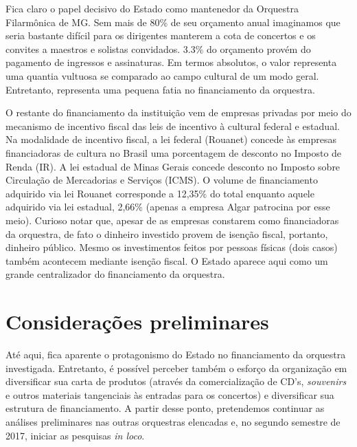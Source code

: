 \documentclass[a4paper, 12pt, openright, oneside, german, french, english, brazil]{abntex2}
\begin{document}
	Fica claro o papel decisivo do Estado como mantenedor da Orquestra Filarmônica de MG. Sem mais de 80\% de seu orçamento anual imaginamos que seria bastante difícil para os dirigentes manterem a cota de concertos e os convites a maestros e solistas convidados. 3.3\% do orçamento provém do pagamento de ingressos e assinaturas. Em termos absolutos, o valor representa uma quantia vultuosa se comparado ao campo cultural de um modo geral. Entretanto, representa uma pequena fatia no financiamento da orquestra.
	
	O restante do financiamento da instituição vem de empresas privadas por meio do mecanismo de incentivo fiscal das leis de incentivo à cultural federal e estadual. Na modalidade de incentivo fiscal, a lei federal (Rouanet) concede às empresas financiadoras de cultura no Brasil uma porcentagem de desconto no Imposto de Renda (IR). A lei estadual de Minas Gerais concede desconto no Imposto sobre Circulação de Mercadorias e Serviços (ICMS). O volume de financiamento adquirido via lei Rouanet corresponde a 12,35\% do total enquanto aquele adquirido via lei estadual, 2,66\% (apenas a empresa Algar patrocina por esse meio). Curioso notar que, apesar de as empresas constarem como financiadoras da orquestra, de fato o dinheiro investido provem de isenção fiscal, portanto, dinheiro público. Mesmo os investimentos feitos por pessoas físicas (dois casos) também acontecem mediante isenção fiscal. O Estado aparece aqui como um grande centralizador do financiamento da orquestra.
	
	
	
	
	
	
	
	\chapter{Considerações preliminares}
	
	Até aqui, fica aparente o protagonismo do Estado no financiamento da orquestra investigada. Entretanto, é possível perceber também o esforço da organização em diversificar sua carta de produtos (através da comercialização de CD's, \textit{souvenirs} e outros materiais tangenciais às entradas para os concertos) e diversificar sua estrutura de financiamento. A partir desse ponto, pretendemos continuar as análises preliminares nas outras orquestras elencadas e, no segundo semestre de 2017, iniciar as pesquisas \textit{in loco}.
	
\end{document}
